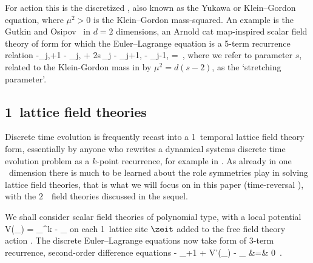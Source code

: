 For action  this is the discretized
{\sPe}, also known as the {Yukawa} or Klein–Gordon
equation, where  ${\mu}^2>0$ is the Klein–Gordon mass-squared.
An example is the Gutkin and Osipov \catlatt\ in  $d=2$
dimensions, an Arnold cat map-inspired scalar field theory  of
form  for which the Euler–\-Lagrange
equation  is a 5-term recurrence relation
\beq
      -\ssp_{j,\zeit+1} - \ssp_{j,}
+ 2{s}\,\ssp_{j\zeit}
     - \ssp_{j+1,\zeit} - \ssp_{j-1, \zeit}
     =  
\,,
where we refer to parameter ${s}$, related to the Klein-Gordon mass in
 by ${\mu}^2=d({s}-2)$, as the `stretching
parameter'.

\subsection{1\dmn\ lattice field theories}
\label{s:LC21FT1d}

Discrete time evolution is frequently recast into a 1\dmn\ temporal
lattice field theory form, essentially by anyone who rewrites a
dynamical systems discrete time evolution problem as a $k$-point recurrence,
for example in
.
As already in one \spt\ dimension there is much to be learned about the
role symmetries play in solving lattice field theories, that is what we
will focus on in this paper (time-reversal
), with the $2$\dmn\ \spt\ field
theories discussed in the sequel.

We shall consider scalar field theories of polynomial type, with a local
potential%
\beq
V(\ssp_\zeit) = \ssp_{\zeit}^k - \Ssym{\zeit}\ssp_{\zeit}
on each  1\dmn\ lattice site $\zeit$ added to the free field theory
action . The discrete Euler–Lagrange equations
 now take form of 3-term recurrence, second-order
difference equations
\bea
- \ssp_{\zeit+1} + V'(\ssp_{\zeit}) - \ssp_{}
    &=&
0  %
\,.  %
\label{LC21:1dTempFT}%
\eea

